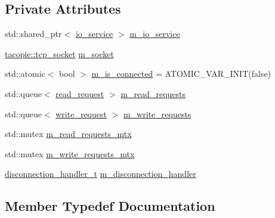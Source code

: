 \subsection*{Private Attributes}
\begin{DoxyCompactItemize}
\item 
std\+::shared\+\_\+ptr$<$ \hyperlink{classtacopie_1_1io__service}{io\+\_\+service} $>$ \hyperlink{classtacopie_1_1tcp__client_a2a5e4ae0f4fbcd375df4cb1f8070b993}{m\+\_\+io\+\_\+service}
\item 
\hyperlink{classtacopie_1_1tcp__socket}{tacopie\+::tcp\+\_\+socket} \hyperlink{classtacopie_1_1tcp__client_ad256815911a745fce8f2aed00fb45b21}{m\+\_\+socket}
\item 
std\+::atomic$<$ bool $>$ \hyperlink{classtacopie_1_1tcp__client_adf45ef6f910a7723fcfe543417f1feaf}{m\+\_\+is\+\_\+connected} = A\+T\+O\+M\+I\+C\+\_\+\+V\+A\+R\+\_\+\+I\+N\+IT(false)
\item 
std\+::queue$<$ \hyperlink{structtacopie_1_1tcp__client_1_1read__request}{read\+\_\+request} $>$ \hyperlink{classtacopie_1_1tcp__client_a458754e266c0f41b42e17806cc59dc2a}{m\+\_\+read\+\_\+requests}
\item 
std\+::queue$<$ \hyperlink{structtacopie_1_1tcp__client_1_1write__request}{write\+\_\+request} $>$ \hyperlink{classtacopie_1_1tcp__client_aabf49a27ada2707f252b295dcec13969}{m\+\_\+write\+\_\+requests}
\item 
std\+::mutex \hyperlink{classtacopie_1_1tcp__client_a792be0da277e372460fbe6977f03d27b}{m\+\_\+read\+\_\+requests\+\_\+mtx}
\item 
std\+::mutex \hyperlink{classtacopie_1_1tcp__client_abc7c664a73d528c0b1c226d35f7bae2f}{m\+\_\+write\+\_\+requests\+\_\+mtx}
\item 
\hyperlink{classtacopie_1_1tcp__client_aca5df52e5ee6fa673cf212532ada1453}{disconnection\+\_\+handler\+\_\+t} \hyperlink{classtacopie_1_1tcp__client_a5ee7259fe6a8258515162e1ed516de20}{m\+\_\+disconnection\+\_\+handler}
\end{DoxyCompactItemize}


\subsection{Member Typedef Documentation}
\mbox{\label{classtacopie_1_1tcp__client_acdf9dea8bac6c56f7b04ce38b9432322}} 

